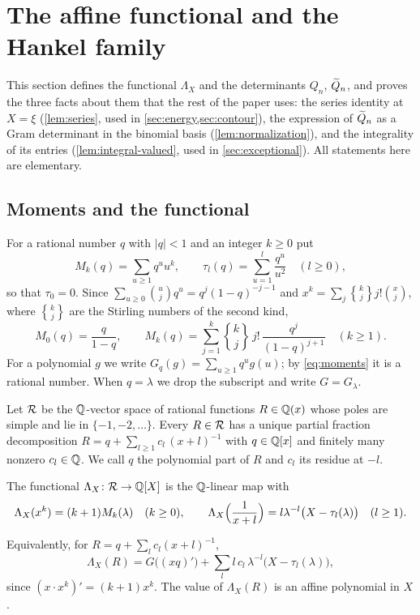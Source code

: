 \section{The affine functional and the Hankel family}\label{sec:functional}

This section defines the functional $\Lambda_X$ and the determinants $Q_n$, $\widetilde{Q}_n$, and proves the three facts about them that the rest of the paper uses: the series identity at $X=\xi$ (\cref{lem:series}, used in \cref{sec:energy,sec:contour}), the expression of $\widetilde{Q}_n$ as a Gram determinant in the binomial basis (\cref{lem:normalization}), and the integrality of its entries (\cref{lem:integral-valued}, used in \cref{sec:exceptional}). All statements here are elementary.

\subsection{Moments and the functional}\label{sec:moments}
For a rational number $q$ with $|q|<1$ and an integer $k\ge0$ put
\[
M_k(q)=\sum_{u\ge1}q^uu^k,\qquad \tau_l(q)=\sum_{u=1}^{l}\frac{q^u}{u^2}\quad(l\ge0),
\]
so that $\tau_0=0$. Since $\sum_{u\ge0}\binom uj q^u=q^j(1-q)^{-j-1}$ and $x^k=\sum_{j}{k\brace j}j!\binom xj$, where ${k\brace j}$ are the Stirling numbers of the second kind,
\begin{equation}\label{eq:moments}
M_0(q)=\frac{q}{1-q},\qquad M_k(q)=\sum_{j=1}^k{k\brace j}\,j!\,\frac{q^j}{(1-q)^{j+1}}\quad(k\ge1).
\end{equation}
For a polynomial $g$ we write $G_q(g)=\sum_{u\ge1}q^ug(u)$; by \eqref{eq:moments} it is a rational number. When $q=\lambda$ we drop the subscript and write $G=G_\lambda$.

Let $\mathcal{R}$ be the $\mathbb{Q}$-vector space of rational functions $R\in\mathbb{Q}(x)$ whose poles are simple and lie in $\{-1,-2,\dots\}$. Every $R\in\mathcal{R}$ has a unique partial fraction decomposition $R=q+\sum_{l\ge1}c_l\,(x+l)^{-1}$ with $q\in\mathbb{Q}[x]$ and finitely many nonzero $c_l\in\mathbb{Q}$. We call $q$ the polynomial part of $R$ and $c_l$ its residue at $-l$.

\begin{definition}\label{def:functional}
The functional $\Lambda_X\colon\mathcal{R}\to\mathbb{Q}[X]$ is the $\mathbb{Q}$-linear map with
\[
\Lambda_X(x^k)=(k+1)M_k(\lambda)\quad(k\ge0),\qquad \Lambda_X\Bigl(\frac1{x+l}\Bigr)=l\lambda^{-l}\bigl(X-\tau_l(\lambda)\bigr)\quad(l\ge1).
\]
\end{definition}

Equivalently, for $R=q+\sum_lc_l(x+l)^{-1}$,
\begin{equation}\label{eq:functional-explicit}
\Lambda_X(R)=G\bigl((xq)'\bigr)+\sum_{l}l\,c_l\,\lambda^{-l}\bigl(X-\tau_l(\lambda)\bigr),
\end{equation}
since $(x\cdot x^k)'=(k+1)x^k$. The value of $\Lambda_X(R)$ is an affine polynomial in $X$.


